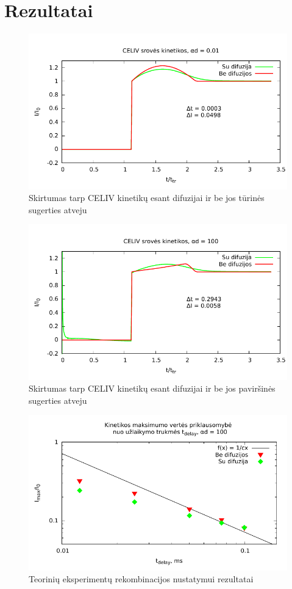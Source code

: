  
\section{Rezultatai}
\begin{figure}[p]
\centering
\includegraphics[width=\textwidth]{./media/pdf/ad001.pdf} 
\caption{Skirtumas tarp CELIV kinetikų esant difuzijai ir be jos tūrinės sugerties atveju}
\label{fig:001}
\end{figure}
\begin{figure}[p]
\centering
\includegraphics[width=\textwidth]{./media/pdf/ad100.pdf}  
\caption{Skirtumas tarp CELIV kinetikų esant difuzijai ir be jos paviršinės sugerties atveju}
\label{fig:100}
\end{figure}
\begin{figure}
  \centering
    \includegraphics[width=\textwidth]{./media/pdf/ad100_recomb.pdf}
  \caption{Teorinių eksperimentų rekombinacijos nustatymui rezultatai}
  \label{fig:blockbuster}
\end{figure}
